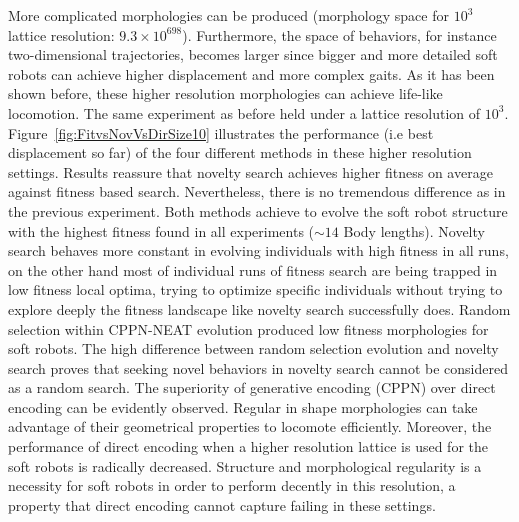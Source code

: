 More complicated morphologies can be produced (morphology space for $10^3$ lattice resolution: $9.3 \times 10^{698}$). Furthermore, the space of behaviors, for instance two-dimensional trajectories, becomes larger since bigger and more detailed soft robots can achieve higher displacement and more complex gaits. As it has been shown before, these higher resolution morphologies can achieve life-like locomotion. The same experiment as before held under a lattice resolution of $10^3$. Figure~\ref{fig:FitvsNovVsDirSize10} illustrates the performance (i.e best displacement so far) of the four different methods in these higher resolution settings. Results reassure that novelty search achieves higher fitness on average against fitness based search. Nevertheless, there is no tremendous difference as in the previous experiment. Both methods achieve to evolve the soft robot structure with the highest fitness found in all experiments ($\sim 14$ Body lengths). Novelty search behaves more constant in evolving individuals with high fitness in all runs, on the other hand most of individual runs of fitness search are being trapped in low fitness local optima, trying to optimize specific individuals without trying to explore deeply the fitness landscape like novelty search successfully does. Random selection within CPPN-NEAT evolution produced low fitness morphologies for soft robots. The high difference between random selection evolution and novelty search proves that seeking novel behaviors in novelty search cannot be considered as a random search. The superiority of generative encoding (CPPN) over direct encoding can be evidently observed. Regular in shape morphologies can take advantage of their geometrical properties to locomote efficiently. Moreover, the performance of direct encoding when a higher resolution lattice is used for the soft robots is radically decreased. Structure and morphological regularity is a necessity for soft robots in order to perform decently in this resolution, a property that direct encoding cannot capture failing in these settings.


